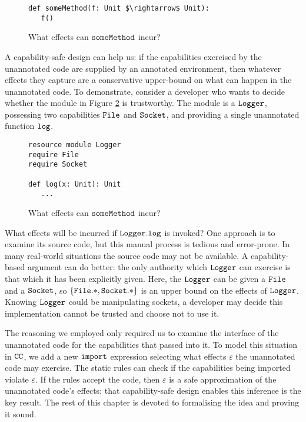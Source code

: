 \begin{figure}[h]
\begin{lstlisting}
def someMethod(f: Unit $\rightarrow$ Unit):
   f()
\end{lstlisting}
\vspace{-7pt}
\caption{What effects can $\mathtt{someMethod}$ incur?}
\label{fig:unannotated_reasoning}
\end{figure}

A capability-safe design can help us: if the capabilities exercised by the unannotated code are supplied by an annotated environment, then whatever effects they capture are a conservative upper-bound on what can happen in the unannotated code. To demonstrate, consider a developer who wants to decide whether the module in Figure \ref{fig:cc_motivation} is trustworthy. The module is a $\mathtt{Logger}$, possessing two capabilities $\mathtt{File}$ and $\mathtt{Socket}$, and providing a single unannotated function $\mathtt{log}$.

\begin{figure}[h]
\begin{lstlisting}
resource module Logger
require File
require Socket

def log(x: Unit): Unit
   ...
\end{lstlisting}
\vspace{-7pt}
\caption{What effects can $\mathtt{someMethod}$ incur?}
\label{fig:cc_motivation}
\end{figure}

What effects will be incurred if $\mathtt{Logger.log}$ is invoked? One approach is to examine its source code, but this manual process is tedious and error-prone. In many real-world situations the source code may not be available. A capability-based argument can do better: the only authority which $\mathtt{Logger}$ can exercise is that which it has been explicitly given. Here, the $\mathtt{Logger}$ can be given a $\mathtt{File}$ and a $\mathtt{Socket}$, so $\mathtt{ \{ \mathtt{File.*, Socket.*} \} }$ is an upper bound on the effects of $\mathtt{Logger}$. Knowing $\mathtt{Logger}$ could be manipulating sockets, a developer may decide this implementation cannot be trusted and choose not to use it.

The reasoning we employed only required us to examine the interface of the unannotated code for the capabilities that passed into it. To model this situation in $\mathtt{CC}$, we add a new $\mathtt{import}$ expression selecting what effects $\varepsilon$ the unannotated code may exercise. The static rules can check if the capabilities being imported violate $\varepsilon$. If the rules accept the code, then $\varepsilon$ is a safe approximation of the unannotated code's effects; that capability-safe design enables this inference is the key result. The rest of this chapter is devoted to formalising the idea and proving it sound.


